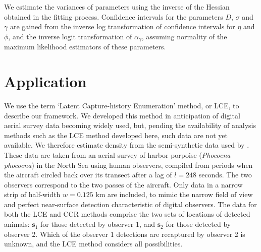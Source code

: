 \documentclass[useAMS, usenatbib, referee]{biom}\usepackage[]{graphicx}\usepackage[]{color}
\begin{document}
We estimate the variances of parameters using the inverse of the Hessian obtained in the fitting process. Confidence intervals for the parameters $D$, $\sigma$ and $\gamma$ are gained from the inverse log transformation of confidence intervals for $\eta$ and $\phi$, and the inverse logit transformation of $\alpha_\gamma$, assuming normality of the maximum likelihood estimators of these parameters.


\section{Application \label{sec:applic}}

We use the term `Latent Capture-history Enumeration' method, or LCE, to describe our framework. We  developed this method in anticipation of digital aerial survey data becoming widely used, but, pending the availability of analysis methods such as the LCE method developed here, such data are not yet available. We therefore estimate density from the semi-synthetic data used by \cite{Stevenson+al:19}. These data are taken from an aerial survey of harbor porpoise ({\em Phocoena phocoena}) in the North Sea using human observers, compiled from periods when the aircraft circled back over its transect after a lag of $l=248$ seconds.
The two observers correspond to the two passes of the aircraft. Only data in a narrow strip of half-width $w=0.125$ km are included, to mimic the narrow field of view and perfect near-surface detection characteristic of digital observers. The data for both the LCE and CCR methods comprise the two sets of locations of detected animals: $\bm{s}_1$ for those detected by observer 1, and $\bm{s}_2$ for those detected by observer 2. Which of the observer 1 detections are recaptured by observer 2 is unknown, and the LCE method considers all possibilities.
\end{document}

